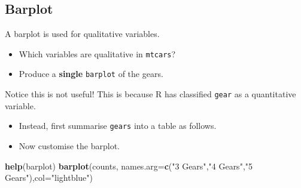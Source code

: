 \documentclass[]{article}
\newenvironment{Shaded}{\begin{snugshade}}{\end{snugshade}}
\newcommand{\CommentTok}[1]{\textcolor[rgb]{0.56,0.35,0.01}{\textit{#1}}}
\newcommand{\DataTypeTok}[1]{\textcolor[rgb]{0.13,0.29,0.53}{#1}}
\newcommand{\KeywordTok}[1]{\textcolor[rgb]{0.13,0.29,0.53}{\textbf{#1}}}
\newcommand{\NormalTok}[1]{#1}
\newcommand{\OperatorTok}[1]{\textcolor[rgb]{0.81,0.36,0.00}{\textbf{#1}}}
\newcommand{\StringTok}[1]{\textcolor[rgb]{0.31,0.60,0.02}{#1}}
\providecommand{\tightlist}{%
  \setlength{\itemsep}{0pt}\setlength{\parskip}{0pt}}
\begin{document}
\hypertarget{barplot}{%
\subsection{Barplot}\label{barplot}}

A barplot is used for qualitative variables.

\begin{itemize}
\item
  Which variables are qualitative in \texttt{mtcars}?
\item
  Produce a \textbf{single} \texttt{barplot} of the gears.
\end{itemize}

\begin{Shaded}
\end{Shaded}

Notice this is not useful! This is because R has classified \texttt{gear} as a quantitative variable.

\begin{itemize}
\tightlist
\item
  Instead, first summarise \texttt{gears} into a table as follows.
\end{itemize}

\begin{Shaded}
\end{Shaded}

\begin{itemize}
\tightlist
\item
  Now customise the barplot.
\end{itemize}

\begin{Shaded}
\begin{Highlighting}[]
\KeywordTok{help}\NormalTok{(barplot)}
\KeywordTok{barplot}\NormalTok{(counts, }\DataTypeTok{names.arg=}\KeywordTok{c}\NormalTok{(}\StringTok{"3 Gears"}\NormalTok{,}\StringTok{"4 Gears"}\NormalTok{,}\StringTok{"5 Gears"}\NormalTok{),}\DataTypeTok{col=}\StringTok{"lightblue"}\NormalTok{)}
\end{Highlighting}
\end{Shaded}
\end{document}
